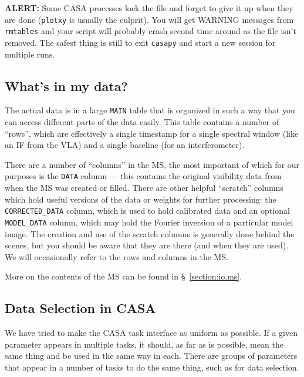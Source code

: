 {\bf ALERT:} Some CASA processes lock the file and forget to
give it up when they are done ({\tt plotxy} is usually the culprit).
You will get WARNING messages from {\tt rmtables} and your script
will probably crash second time around as the file isn't removed.
The safest thing is still to exit {\tt casapy} and start a new 
session for multiple runs.

\subsection{What's in my data?}
\label{section:intro.common.ms}

The actual data is in a large {\tt MAIN} table that is organized in
such a way that you can access different parts of the data easily.
This table contains a number of ``rows'', which are effectively a
single timestamp for a single spectral window (like an IF from the
VLA) and a single baseline (for an interferometer).  

There are a number of ``columns'' in the MS, the most important of
which for our purposes is the {\tt DATA} column --- this contains the
original visibility data from when the MS was created or filled.
There are other helpful ``scratch'' columns which hold useful versions
of the data or weights for further processing: the {\tt
  CORRECTED\_DATA} column, which is used to hold calibrated data and
an optional {\tt MODEL\_DATA} column, which may hold the Fourier inversion of a
particular model image.  The creation and use of the scratch columns
is generally done behind the scenes, but you should be aware that they
are there (and when they are used).  We will occasionally refer to the
rows and columns in the MS.

More on the contents of the MS can be found in \S~\ref{section:io.ms}.

\subsection{Data Selection in CASA}
\label{section:intro.common.selection}

We have tried to make the CASA task interface as uniform as possible.
If a given parameter appears in multiple tasks, it should, as far as
is possible, mean the same thing and be used in the same way in each.
There are groups of parameters that appear in a number of tasks to
do the same thing, such as for data selection.

